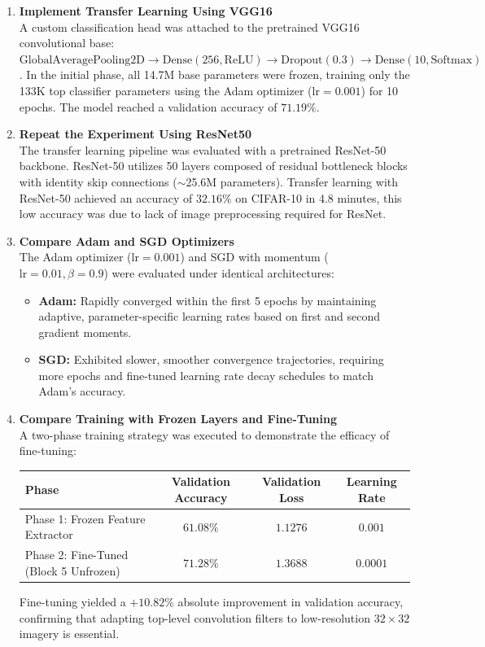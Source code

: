\documentclass[11pt]{article}
\begin{document}
\begin{enumerate}[label=\textbf{\arabic*.}]
    \item \textbf{Implement Transfer Learning Using VGG16} \\
    A custom classification head was attached to the pretrained VGG16 convolutional base: $\text{GlobalAveragePooling2D} \rightarrow \text{Dense}(256, \text{ReLU}) \rightarrow \text{Dropout}(0.3) \rightarrow \text{Dense}(10, \text{Softmax})$. In the initial phase, all 14.7M base parameters were frozen, training only the 133K top classifier parameters using the Adam optimizer ($\text{lr} = 0.001$) for 10 epochs. The model reached a validation accuracy of $71.19\%$.

    \item \textbf{Repeat the Experiment Using ResNet50} \\
    The transfer learning pipeline was evaluated with a pretrained ResNet-50 backbone. ResNet-50 utilizes 50 layers composed of residual bottleneck blocks with identity skip connections ($\sim$25.6M parameters). Transfer learning with ResNet-50 achieved an accuracy of $32.16\%$ on CIFAR-10 in 4.8 minutes, this low accuracy was due to lack of image preprocessing required for ResNet.

    \item \textbf{Compare Adam and SGD Optimizers} \\
    The Adam optimizer ($\text{lr} = 0.001$) and SGD with momentum ($\text{lr} = 0.01, \beta = 0.9$) were evaluated under identical architectures:
    \begin{itemize}
        \item \textbf{Adam:} Rapidly converged within the first 5 epochs by maintaining adaptive, parameter-specific learning rates based on first and second gradient moments.
        \item \textbf{SGD:} Exhibited slower, smoother convergence trajectories, requiring more epochs and fine-tuned learning rate decay schedules to match Adam's accuracy.
    \end{itemize}

    \item \textbf{Compare Training with Frozen Layers and Fine-Tuning} \\
    A two-phase training strategy was executed to demonstrate the efficacy of fine-tuning:
    \begin{center}
    \begin{tabular}{|l|c|c|c|}
    \hline
    \textbf{Phase} & \textbf{Validation Accuracy} & \textbf{Validation Loss} & \textbf{Learning Rate} \\
    \hline
    Phase 1: Frozen Feature Extractor & $61.08\%$ & $1.1276$ & $0.001$ \\
    \hline
    Phase 2: Fine-Tuned (Block 5 Unfrozen) & $71.28\%$ & $1.3688$ & $0.0001$ \\
    \hline
    \end{tabular}
    \end{center}
    Fine-tuning yielded a $+10.82\%$ absolute improvement in validation accuracy, confirming that adapting top-level convolution filters to low-resolution $32\times32$ imagery is essential.


\end{enumerate}
\end{document}
